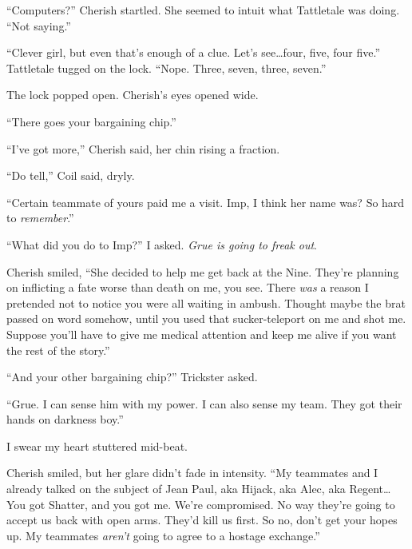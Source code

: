 ``Computers?'' Cherish startled.  She seemed to intuit what Tattletale was doing.  ``Not saying.''



``Clever girl, but even that's enough of a clue.  Let's see\ldots four, five, four five.''  Tattletale tugged on the lock.  ``Nope.  Three, seven, three, seven.''



The lock popped open.  Cherish's eyes opened wide.



``There goes your bargaining chip.''



``I've got more,'' Cherish said, her chin rising a fraction.



``Do tell,'' Coil said, dryly.



``Certain teammate of yours paid me a visit.  Imp, I think her name was?  So hard to \emph{remember}.''



``What did you do to Imp?'' I asked.  \emph{Grue is going to freak out}.



Cherish smiled, ``She decided to help me get back at the Nine.  They're planning on inflicting a fate worse than death on me, you see.  There \emph{was} a reason I pretended not to notice you were all waiting in ambush.  Thought maybe the brat passed on word somehow, until you used that sucker-teleport on me and shot me.  Suppose you'll have to give me medical attention and keep me alive if you want the rest of the story.''



``And your other bargaining chip?'' Trickster asked.



``Grue.  I can sense him with my power.  I can also sense my team.  They got their hands on darkness boy.''



I swear my heart stuttered mid-beat.



Cherish smiled, but her glare didn't fade in intensity.  ``My teammates and I already talked on the subject of Jean Paul, aka Hijack, aka Alec, aka Regent\ldots  You got Shatter, and you got me.  We're compromised.  No way they're going to accept us back with open arms.  They'd kill us first.  So no, don't get your hopes up.  My teammates \emph{aren't} going to agree to a hostage exchange.''





